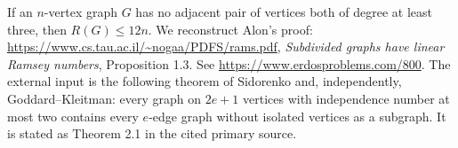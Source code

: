 If an \(n\)-vertex graph \(G\) has no adjacent pair of vertices
both of degree at least three, then \(R(G)\leq12n\).
We reconstruct Alon's proof:
\url{https://www.cs.tau.ac.il/~nogaa/PDFS/rams.pdf},
\emph{Subdivided graphs have linear Ramsey numbers},
Proposition 1.3. See \url{https://www.erdosproblems.com/800}.
The external input is the following theorem of
Sidorenko and, independently, Goddard--Kleitman:
every graph on \(2e+1\) vertices with independence number
at most two contains every \(e\)-edge graph without
isolated vertices as a subgraph.
It is stated as Theorem 2.1 in the cited primary source.
